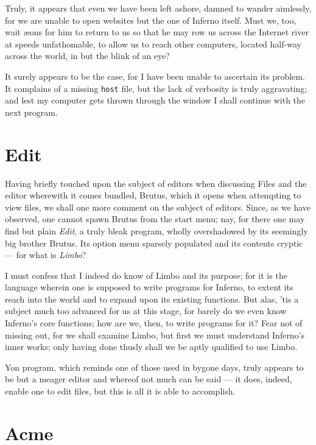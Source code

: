 \documentclass[a5paper,twoside,12pt]{report}
\begin{document}
      Truly, it appears that even we have been left ashore, damned to wander aimlessly, for we are unable to open websites but the one of Inferno itself. Must we, too, wait æons for him to return to us so that he may row us across the Internet river at speeds unfathomable, to allow us to reach other computers, located half-way across the world, in but the blink of an eye?


      It surely appears to be the case, for I have been unable to ascertain its problem. It complains of a missing \texttt{host} file, but the lack of verbosity is truly aggravating; and lest my computer gets thrown through the window I shall continue with the next program.

      \section*{Edit}


      Having briefly touched upon the subject of editors when discussing Files and the editor wherewith it comes bundled, Brutus, which it opens when attempting to view files, we shall one more comment on the subject of editors. Since, as we have observed, one cannot spawn Brutus from the start menu; nay, for there one may find but plain \textit{Edit}, a truly bleak program, wholly overshadowed by its seemingly big brother Brutus. Its option menu sparsely populated and its contents cryptic — for what is \textit{Limbo}?

      I must confess that I indeed do know of Limbo and its purpose; for it is the language wherein one is supposed to write programs for Inferno, to extent its reach into the world and to expand upon its existing functions. But alas, 'tis a subject much too advanced for us at this stage, for barely do we even know Inferno's core functions; how are we, then, to write programs for it? Fear not of missing out, for we shall examine Limbo, but first we must understand Inferno's inner works; only having done thusly shall we be aptly qualified to use Limbo.

      Yon program, which reminds one of those used in bygone days, truly appears to be but a meager editor and whereof not much can be said — it does, indeed, enable one to edit files, but this is all it is able to accomplish.

      \section*{Acme}
\end{document}

